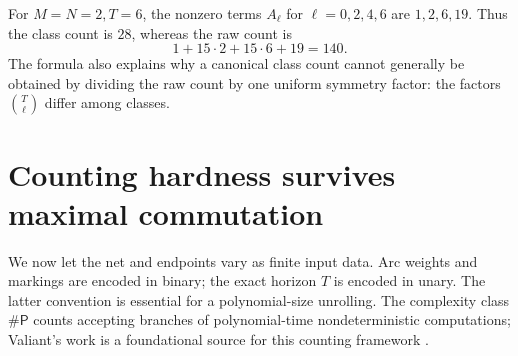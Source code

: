 \documentclass[11pt,a4paper]{article}
\theoremstyle{definition}
\theoremstyle{remark}
\newcommand{\sharpP}{\mathsf{\#P}}
\newcommand{\srctag}[1]{\texorpdfstring{\hspace{0.5em}{\normalfont\small\color{accent}[#1]}}{ [#1]}}
\begin{document}
For $M=N=2,T=6$, the nonzero terms $A_\ell$ for $\ell=0,2,4,6$ are $1,2,6,19$. Thus the class count is $28$, whereas the raw count is
\[
1+15\cdot2+15\cdot6+19=140.
\]
The formula also explains why a canonical class count cannot generally be obtained by dividing the raw count by one uniform symmetry factor: the factors $\binom T\ell$ differ among classes.

\section{Counting hardness survives maximal commutation\srctag{05}}
\label{cdc:sec:counting}
We now let the net and endpoints vary as finite input data. Arc weights and markings are encoded in binary; the exact horizon $T$ is encoded in unary. The latter convention is essential for a polynomial-size unrolling. The complexity class $\sharpP$ counts accepting branches of polynomial-time nondeterministic computations; Valiant's work is a foundational source for this counting framework \cite{valiant}.
\end{document}
